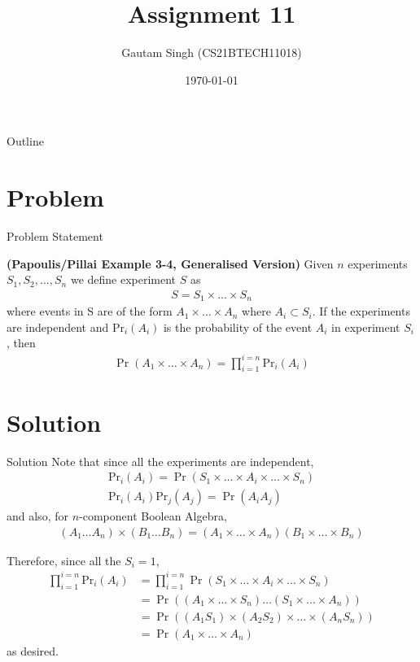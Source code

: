\documentclass{beamer}
\title{Assignment 11}
\author{Gautam Singh (CS21BTECH11018)}
\date{\today}
\providecommand{\pri}[2]{\ensuremath{\text{Pr}_{#1}\left(#2\right)}}
\providecommand{\pr}[1]{\ensuremath{\Pr\left(#1\right)}}
\begin{document}
\begin{frame}
    \titlepage 
\end{frame}

\begin{frame}{Outline}
    \tableofcontents
\end{frame}


\section{Problem}
\begin{frame}{Problem Statement}

\textbf{(Papoulis/Pillai Example 3-4, Generalised Version)} Given $n$ experiments $S_1, S_2, \ldots, S_n$ we define experiment $S$ as
\begin{align}
	S = S_1 \times \ldots \times S_n
	\label{eq:S-defn}
\end{align}
	where events in S are of the form $A_1 \times \ldots \times A_n$ where $A_i \subset S_i$. If the experiments are independent and $\pri{i}{A_i}$ is the probability of the event $A_i$ in experiment $S_i$, then
\begin{align}
	\pr{A_1 \times \ldots \times A_n} = \prod_{i = 1}^{i = n}\pri{i}{A_i}
	\label{eq:identity}
\end{align}
\end{frame}


\section{Solution}

\begin{frame}{Solution}
	Note that since all the experiments are independent,
	\begin{align}
		\pri{i}{A_i} = \pr{S_1 \times \ldots \times A_i \times \ldots \times S_n} \\
		\pri{i}{A_i}\pri{j}{A_j} = \pr{A_{i}A_{j}}
		\label{eq:indep}
	\end{align}
	and also, for $n$-component Boolean Algebra,
	\begin{align}
		(A_1 \ldots A_n) \times (B_1 \ldots B_n) = (A_1 \times \ldots \times A_n)(B_1 \times \ldots \times B_n) 
		\label{eq:cartesian}
	\end{align}
\end{frame}

\begin{frame}
	Therefore, since all the $S_i = 1$,
	\begin{align}
		\prod_{i = 1}^{i = n}\pri{i}{A_i} &= \prod_{i = 1}^{i = n}\pr{S_1 \times \ldots \times A_i \times \ldots \times S_n} \\
		&= \pr{(A_1 \times \ldots \times S_n)\ldots(S_1 \times \ldots \times A_n)} \\
		&= \pr{(A_1S_1)\times(A_2S_2)\times\ldots\times(A_nS_n)} \\
		&= \pr{A_1 \times \ldots \times A_n}
		\label{eq:sol}
	\end{align}
	as desired.
\end{frame}
\end{document}
